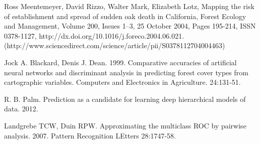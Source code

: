\documentclass[11pt]{article}
\begin{document}
\begin{thebibliography}{}
Ross Meentemeyer, David Rizzo, Walter Mark, Elizabeth Lotz, Mapping the risk of establishment and spread of sudden oak death in California, Forest Ecology and Management, Volume 200, Issues 1–3, 25 October 2004, Pages 195-214, ISSN 0378-1127, http://dx.doi.org/10.1016/j.foreco.2004.06.021.
(http://www.sciencedirect.com/science/article/pii/S0378112704004463)

Jock A. Blackard, Denis J. Dean. 1999. Comparative accuracies of artificial neural networks and discriminant analysis in predicting forest cover types from cartographic variables. Computers and Electronics in Agriculture. 24:131-51.

R. B. Palm. Prediction as a candidate for learning deep hierarchical models of data. 2012.

Landgrebe TCW, Duin RPW. Approximating the multiclass ROC by pairwise analysis. 2007. Pattern Recognition LEtters 28:1747-58.



\end{thebibliography}
\end{document}
